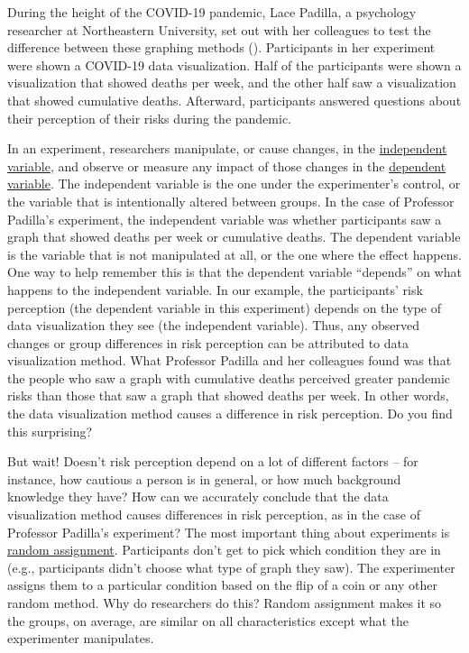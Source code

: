 \documentclass[
]{krantz}
\begin{document}
During the height of the COVID-19 pandemic, Lace Padilla, a psychology researcher at Northeastern University, set out with her colleagues to test the difference between these graphing methods (). Participants in her experiment were shown a COVID-19 data visualization. Half of the participants were shown a visualization that showed deaths per week, and the other half saw a visualization that showed cumulative deaths. Afterward, participants answered questions about their perception of their risks during the pandemic.

In an experiment, researchers manipulate, or cause changes, in the \hyperref[independent-variable]{independent variable}, and observe or measure any impact of those changes in the \hyperref[dependent-variable]{dependent variable}. The independent variable is the one under the experimenter's control, or the variable that is intentionally altered between groups. In the case of Professor Padilla's experiment, the independent variable was whether participants saw a graph that showed deaths per week or cumulative deaths. The dependent variable is the variable that is not manipulated at all, or the one where the effect happens. One way to help remember this is that the dependent variable ``depends'' on what happens to the independent variable. In our example, the participants' risk perception (the dependent variable in this experiment) depends on the type of data visualization they see (the independent variable). Thus, any observed changes or group differences in risk perception can be attributed to data visualization method. What Professor Padilla and her colleagues found was that the people who saw a graph with cumulative deaths perceived greater pandemic risks than those that saw a graph that showed deaths per week. In other words, the data visualization method causes a difference in risk perception. Do you find this surprising?

But wait! Doesn't risk perception depend on a lot of different factors -- for instance, how cautious a person is in general, or how much background knowledge they have? How can we accurately conclude that the data visualization method causes differences in risk perception, as in the case of Professor Padilla's experiment? The most important thing about experiments is \hyperref[random-assignment]{random assignment}. Participants don't get to pick which condition they are in (e.g., participants didn't choose what type of graph they saw). The experimenter assigns them to a particular condition based on the flip of a coin or any other random method. Why do researchers do this? Random assignment makes it so the groups, on average, are similar on all characteristics except what the experimenter manipulates.
\end{document}
